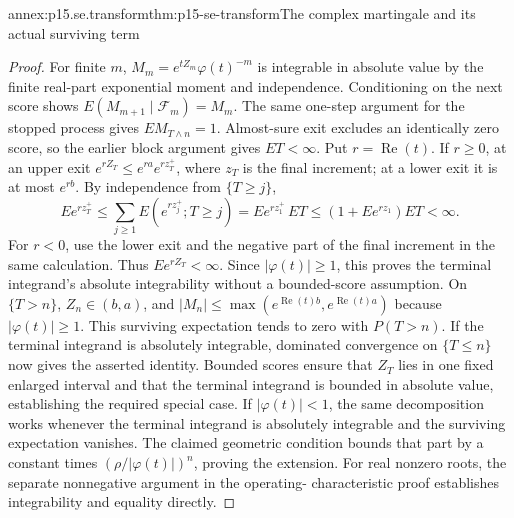 \begin{annexitem}{annex:p15.se.transform}{thm:p15-se-transform}{The complex martingale and its actual surviving term}
\begin{proof}
For finite \(m\), \(M_m=e^{tZ_m}\varphi(t)^{-m}\) is integrable
in absolute value by the finite real-part exponential moment and
independence. Conditioning on the next score shows
\(E(M_{m+1}\mid\mathcal F_m)=M_m\). The same one-step argument for
the stopped process gives \(EM_{T\wedge n}=1\).
Almost-sure exit excludes an identically zero score, so the earlier
block argument gives \(ET<\infty\). Put \(r=\operatorname{Re}(t)\).
If \(r\geq0\), at an upper exit
\(e^{rZ_T}\leq e^{ra}e^{rz_T^+}\), where \(z_T\) is the final
increment; at a lower exit it is at most \(e^{rb}\). By independence
from \(\{T\geq j\}\),
\[
 E e^{rz_T^+}\leq
 \sum_{j\geq1}E(e^{rz_j^+};T\geq j)
       =E e^{rz_1^+}\,ET
       \leq(1+Ee^{rz_1})ET<\infty.
\]
For \(r<0\), use the lower exit and the negative part of the final
increment in the same calculation. Thus \(Ee^{rZ_T}<\infty\).
Since \(|\varphi(t)|\geq1\), this proves the terminal integrand's
absolute integrability without a bounded-score assumption.
On \(\{T>n\}\), \(Z_n\in(b,a)\), and
\(|M_n|\leq\max(e^{\operatorname{Re}(t)b},e^{\operatorname{Re}(t)a})\)
because \(|\varphi(t)|\geq1\). This surviving expectation tends to
zero with \(P(T>n)\). If the terminal integrand is absolutely
integrable, dominated convergence on \(\{T\leq n\}\) now gives
the asserted identity. Bounded scores ensure that \(Z_T\) lies in
one fixed enlarged interval and that the terminal integrand is bounded
in absolute value, establishing the required special case. If
\(|\varphi(t)|<1\), the same decomposition works whenever the
terminal integrand is absolutely integrable and the surviving expectation
vanishes. The claimed geometric condition bounds that part by a constant
times \((\rho/|\varphi(t)|)^n\), proving the extension. For real
nonzero roots, the separate nonnegative argument in the operating-
characteristic proof establishes integrability and equality directly.


\end{proof}
\end{annexitem}
